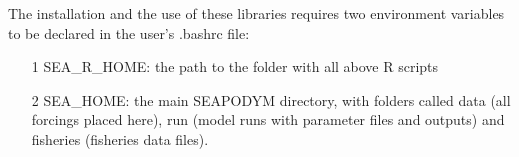 \setlength\parindent{1cm}

The installation and the use of these libraries requires two environment variables to be declared in the user's {\ttfamily .bashrc} file:\\

\begin{itemize}
\item[1] {\ttfamily SEA\_R\_HOME}: the path to the folder with all above R scripts
\item[2] {\ttfamily SEA\_HOME}:   the main SEAPODYM directory, with folders called {\ttfamily data} (all forcings placed here), {\ttfamily run} (model runs with parameter files and outputs) and {\ttfamily fisheries} (fisheries data files).
\end{itemize}




